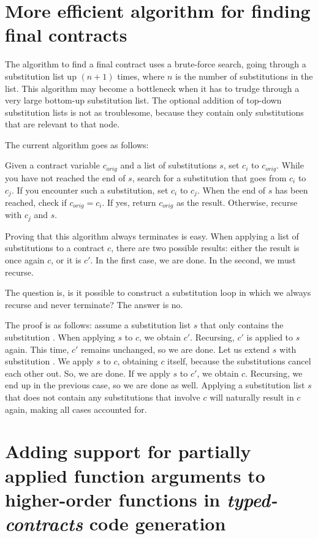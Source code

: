 \documentclass[10pt]{report}
\newcommand{\code}[1]{%
  {%
   \setlength{\fboxsep}{-2\fboxrule}%
   \fcolorbox{black}{light-gray}{\hspace{1.5pt}\strut\texttt{#1}\hspace{1.5pt}}%
  }%
}
\begin{document}
{\section{More efficient algorithm for finding final contracts}
\label{futurework:efficientsubstalgo}

The algorithm to find a final contract uses a brute-force search, going through a substitution list up $(n+1)$ times, where $n$ is the number of substitutions in the list. 
This algorithm may become a bottleneck when it has to trudge through a very large bottom-up substitution list.
The optional addition of top-down substitution lists is not as troublesome, because they contain only substitutions that are relevant to that node.

The current algorithm goes as follows:

Given a contract variable $c_{orig}$ and a list of substitutions $s$, set $c_i$ to $c_{orig}$.
While you have not reached the end of $s$, search for a substitution that goes from $c_i$ to $c_j$.
If you encounter such a substitution, set $c_i$ to $c_j$.
When the end of $s$ has been reached, check if $c_{orig} = c_i$.
If yes, return $c_{orig}$ as the result.
Otherwise, recurse with $c_j$ and $s$.

Proving that this algorithm always terminates is easy.
When applying a list of substitutions to a contract $c$, there are two possible results: either the result is once again $c$, or it is $c'$.
In the first case, we are done.
In the second, we must recurse.

The question is, is it possible to construct a substitution loop in which we always recurse and never terminate?
The answer is no.

The proof is as follows:
assume a substitution list $s$ that only contains the substitution \code{c $\mapsto$ c$'$}.
When applying $s$ to $c$, we obtain $c'$.
Recursing, $c'$ is applied to $s$ again.
This time, $c'$ remains unchanged, so we are done.
Let us extend $s$ with substitution \code{c$'$ $\mapsto$ c}.
We apply $s$ to $c$, obtaining $c$ itself, because the substitutions cancel each other out.
So, we are done.
If we apply $s$ to $c'$, we obtain $c$.
Recursing, we end up in the previous case, so we are done as well.
Applying a substitution list $s$ that does not contain any substitutions that involve $c$ will naturally result in $c$ again, making all cases accounted for.

\section{Adding support for partially applied function arguments to higher-order functions in \textit{typed-contracts} code generation}

}
\end{document}
